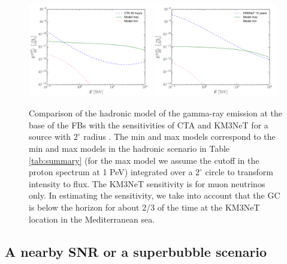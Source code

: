 \begin{figure}[h]
\centering
 \includegraphics[width=0.48\textwidth]{plots/low_lat_FB_CTA.pdf}
 \includegraphics[width=0.48\textwidth]{plots/low_lat_FB_KM3.pdf}
 \caption{Comparison of the hadronic model of the gamma-ray emission at the base of the FBs
 with the sensitivities of CTA and KM3NeT for a source with $2^\circ$ radius \citep{2018APh...100...69A}.
 The min and max models correspond to the min and max models in
 the hadronic scenario in Table \ref{tab:summary} (for the max model we assume the cutoff in the proton spectrum at 1 PeV)
 integrated over a $2^\circ$ circle to transform intensity to flux.
 The KM3NeT sensitivity is for muon neutrinos only.
 In estimating the sensitivity, we take into account that the GC is below the horizon for about 2/3 of the time
 at the KM3NeT location in the Mediterranean sea.
 }
 \label{fig:sensitivities}
\end{figure}


\subsection{A nearby SNR or a superbubble scenario}


